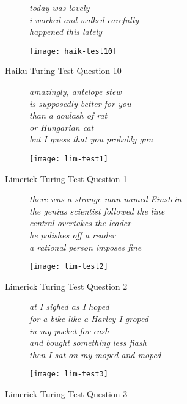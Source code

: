 \begin{figure}[H]
\centering
\begin{subfigure}[t!]{0.45\textwidth}
	\centering
    \textit{today was lovely\\i worked and walked carefully\\happened this lately}
\end{subfigure}
\begin{subfigure}[t!]{0.45\textwidth}
	\centering
    \texttt{[image: haik-test10]}
\end{subfigure}
\caption{Haiku Turing Test Question 10}
\label{fig:haik-test10}
\end{figure}

\begin{figure}[H]
\centering
\begin{subfigure}[t!]{0.45\textwidth}
	\centering
    \textit{amazingly, antelope stew\\is supposedly better for you\\than a goulash of rat\\or Hungarian cat\\but I guess that you probably gnu}
\end{subfigure}
\begin{subfigure}[t!]{0.45\textwidth}
	\centering
    \texttt{[image: lim-test1]}
\end{subfigure}
\caption{Limerick Turing Test Question 1}
\label{fig:lim-test1}
\end{figure}

\begin{figure}[H]
\centering
\begin{subfigure}[t!]{0.45\textwidth}
	\centering
    \textit{there was a strange man named Einstein\\the genius scientist followed the line\\central overtakes the leader\\he polishes off a reader\\a rational person imposes fine}
\end{subfigure}
\begin{subfigure}[t!]{0.45\textwidth}
	\centering
    \texttt{[image: lim-test2]}
\end{subfigure}
\caption{Limerick Turing Test Question 2}
\label{fig:lim-test2}
\end{figure}

\begin{figure}[H]
\centering
\begin{subfigure}[t!]{0.45\textwidth}
	\centering
    \textit{at I sighed as I hoped\\for a bike like a Harley I groped\\in my pocket for cash\\and bought something less flash\\then I sat on my moped and moped}
\end{subfigure}
\begin{subfigure}[t!]{0.45\textwidth}
	\centering
    \texttt{[image: lim-test3]}
\end{subfigure}
\caption{Limerick Turing Test Question 3}
\label{fig:lim-test3}
\end{figure}

